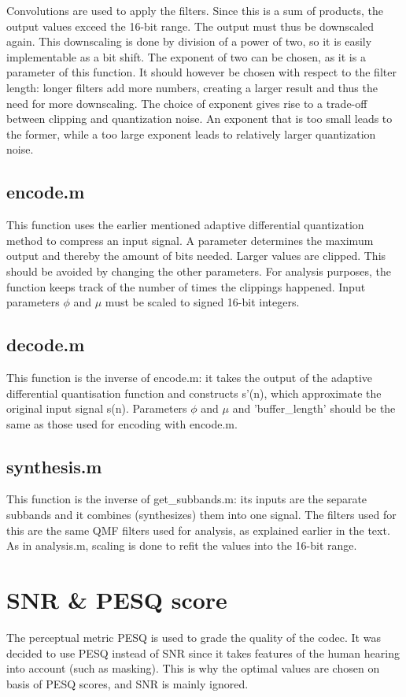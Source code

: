 \documentclass[a4paper]{article}
\begin{document}
Convolutions are used to apply the filters. Since this is a sum of products, the output values exceed the 16-bit range. The output must thus be downscaled again. This downscaling is done by division of a power of two, so it is easily implementable as a bit shift. The exponent of two can be chosen, as it is a parameter of this function. It should however be chosen with respect to the filter length: longer filters add more numbers, creating a larger result and thus the need for more downscaling. The choice of exponent gives rise to a trade-off between clipping and quantization noise. An exponent that is too small leads to the former, while a too large exponent leads to relatively larger quantization noise.

\subsection{encode.m}
This function uses the earlier mentioned adaptive differential quantization method to compress an input signal. A parameter determines the maximum output and thereby the amount of bits needed. Larger values are clipped. This should be avoided by changing the other parameters. For analysis purposes, the function keeps track of the number of times the clippings happened. Input parameters $\phi$ and $\mu$ must be scaled to signed 16-bit integers.

\subsection{decode.m}
This function is the inverse of encode.m: it takes the output of the adaptive differential quantisation function and constructs s'(n), which approximate the original input signal s(n). Parameters $\phi$ and $\mu$ and 'buffer\_length' should be the same as those used for encoding with encode.m.


\subsection{synthesis.m}
This function is the inverse of get\_subbands.m: its inputs are the separate subbands and it combines (synthesizes) them into one signal. The filters used for this are the same QMF filters used for analysis, as explained earlier in the text. As in analysis.m, scaling is done to refit the values into the 16-bit range.

\section{SNR \& PESQ score}
The perceptual metric PESQ is used to grade the quality of the codec. It was decided to use PESQ instead of SNR since it takes features of the human hearing into account (such as masking). This is why the optimal values are chosen on basis of PESQ scores, and SNR is mainly ignored.
\end{document}

